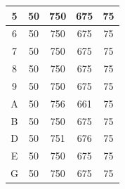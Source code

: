 \begin{center}
\begin{longtable}[c]{|c|c|c|c|c|}
  5              & 50                    & 750                     & 675                                                                       & 75                                                                             \\ \hline
  6              & 50                    & 750                     & 675                                                                       & 75                                                                             \\ \hline
  7              & 50                    & 750                     & 675                                                                       & 75                                                                             \\ \hline
  8              & 50                    & 750                     & 675                                                                       & 75                                                                             \\ \hline
  9              & 50                    & 750                     & 675                                                                       & 75                                                                             \\ \hline
  A              & 50                    & 756                     & 661                                                                       & 75                                                                             \\ \hline
  B              & 50                    & 750                     & 675                                                                       & 75                                                                             \\ \hline
  D              & 50                    & 751                     & 676                                                                       & 75                                                                             \\ \hline
  E              & 50                    & 750                     & 675                                                                       & 75                                                                             \\ \hline
  G              & 50                    & 750                     & 675                                                                       & 75                                                                             \\ \hline

\end{longtable}
\end{center}
